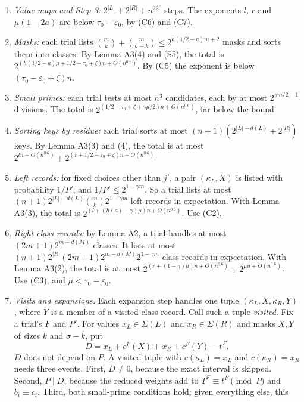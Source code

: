 \documentclass[10pt,a4paper]{article}
\begin{document}
\begin{enumerate}
\item \emph{Value maps and Step 3:} $2^{|L|} + 2^{|R|} + n^22^{v}$ steps. The exponents $l$, $r$ and $\mu(1-2a)$ are below
$\tau_0 - \varepsilon_0$, by (C6) and (C7).
\item \emph{Masks:} each trial lists $\binom mk + \binom m{\sigma-k} \le 2^{h(1/2-a)m + 2}$ masks and sorts them into classes.
By Lemma A3(4) and (S5), the total is $2^{(h(1/2-a)\mu + 1/2 - \tau_0 + \zeta)n + O(n^{0.6})}$. By (C5) the exponent
is below $(\tau_0 - \varepsilon_0 + \zeta)n$.
\item \emph{Small primes:} each trial tests at most $n^3$ candidates, each by at most $2^{\gamma m/2 + 1}$ divisions. The total
is $2^{(1/2 - \tau_0 + \zeta + \gamma\mu/2)n + O(n^{0.6})}$, far below the bound.
\item \emph{Sorting keys by residue:} each trial sorts at most $(n+1)(2^{|L| - d(L)} + 2^{|R|})$ keys. By Lemma A3(3) and (4),
the total is at most $2^{ln + O(n^{0.6})} + 2^{(r + 1/2 - \tau_0 + \zeta)n + O(n^{0.6})}$.
\item \emph{Left records:} for fixed choices other than $j'$, a pair $(\kappa_L, X)$ is listed with probability $1/P'$, and
$1/P' \le 2^{1-\gamma m}$. So a trial lists at most $(n+1)2^{|L| - d(L)}\binom mk2^{1-\gamma m}$ left records in
expectation. With Lemma A3(3), the total is $2^{(l + (h(a) - \gamma)\mu)n + O(n^{0.6})}$. Use (C2).
\item \emph{Right class records:} by Lemma A2, a trial handles at most $(2m+1)2^{m-d(M)}$ classes. It lists at most
$(n+1)2^{|R|}(2m+1)2^{m-d(M)}2^{1-\gamma m}$ class records in expectation. With Lemma A3(2), the total is at most
$2^{(r + (1-\gamma)\mu)n + O(n^{0.6})} + 2^{\mu n + O(n^{0.6})}$. Use (C3), and $\mu < \tau_0 - \varepsilon_0$.
\item \emph{Visits and expansions.} Each expansion step handles one tuple $(\kappa_L, X, \kappa_R, Y)$, where $Y$ is a member of a
visited class record. Call such a tuple \emph{visited}. Fix a trial's $F$ and $P'$. For values $x_L \in \Sigma(L)$ and
$x_R \in \Sigma(R)$ and masks $X, Y$ of sizes $k$ and $\sigma - k$, put
\[D = x_L + c^F(X) + x_R + c^F(Y) - t^F.\]
$D$ does not depend on $P$. A visited tuple with $c(\kappa_L) = x_L$ and $c(\kappa_R) = x_R$ needs three events.
First, $D \ne 0$, because the exact interval is skipped. Second, $P \mid D$, because the reduced weights add to
$T^F \equiv t^F \pmod P$ and $b_i \equiv c_i$. Third, both small-prime conditions hold; given everything else, this

\end{enumerate}
\end{document}

